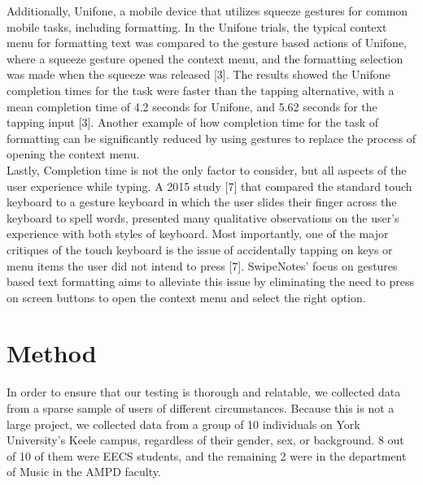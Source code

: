 \documentclass[conference]{IEEEtran}
\begin{document}
Additionally, Unifone, a mobile device that utilizes squeeze gestures for common mobile tasks, including formatting. In the Unifone trials, the typical context menu for formatting text was compared to the gesture based actions of Unifone, where a squeeze gesture opened the context menu, and the formatting selection was made when the squeeze was released [3]. The results showed the Unifone completion times for the task were faster than the tapping alternative, with a mean completion time of 4.2 seconds for Unifone, and 5.62 seconds for the tapping input [3]. Another example of how completion time for the task of formatting can be significantly reduced by using gestures to replace the process of opening the context menu.\\


Lastly, Completion time is not the only factor to consider, but all aspects of the user experience while typing. A 2015 study [7] that compared the standard touch keyboard to a gesture keyboard in which the user slides their finger across the keyboard to spell words, presented many qualitative observations on the user’s experience with both styles of keyboard. Most importantly, one of the major critiques of the touch keyboard is the issue of accidentally tapping on keys or menu items the user did not intend to press [7]. SwipeNotes’ focus on gestures based text formatting aims to alleviate this issue by eliminating the need to press on screen buttons to open the context menu and select the right option.

\section{Method}
In order to ensure that our testing is thorough and relatable, we collected data from a sparse sample of users of different circumstances. Because this is not a large project, we collected data from a group of 10 individuals on York University's Keele campus, regardless of their gender, sex, or background. 8 out of 10 of them were EECS students, and the remaining 2 were in the department of Music in the AMPD faculty.
\end{document}
